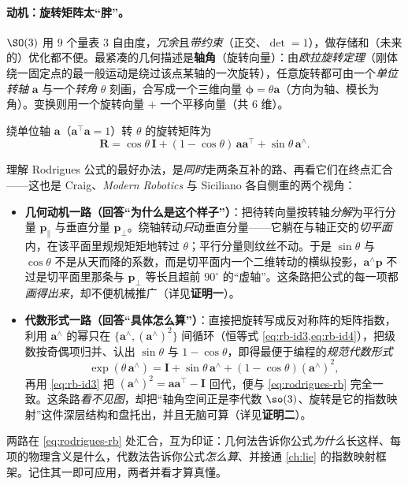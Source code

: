 \paragraph{动机：旋转矩阵太“胖”。}$\SO(3)$ 用 $9$ 个量表 $3$ 自由度，\emph{冗余}且\emph{带约束}（正交、$\det=1$），做存储和（未来的）优化都不便\cite{gaoxiang2019slam14}。最紧凑的几何描述是\textbf{轴角}（旋转向量）：由\emph{欧拉旋转定理}（刚体绕一固定点的最一般运动是绕过该点某轴的一次旋转\cite{barfoot2024state}），任意旋转都可由一个\emph{单位转轴} $\mathbf{a}$ 与一个\emph{转角} $\theta$ 刻画，合写成一个三维向量 $\boldsymbol{\phi}=\theta\mathbf{a}$（方向为轴、模长为角）。变换则用一个旋转向量 $+$ 一个平移向量（共 $6$ 维）。

\begin{theorem}\label{thm:rodrigues-rb}
绕单位轴 $\mathbf{a}$（$\mathbf{a}^\top\mathbf{a}=1$）转 $\theta$ 的旋转矩阵为
\begin{equation}
  \mathbf{R}=\cos\theta\,\mathbf{I}+(1-\cos\theta)\,\mathbf{a}\mathbf{a}^\top+\sin\theta\,\mathbf{a}^\wedge.
  \label{eq:rodrigues-rb}
\end{equation}
\end{theorem}
\begin{insight}
理解 Rodrigues 公式的最好办法，是\emph{同时}走两条互补的路、再看它们在终点汇合——这也是 Craig\cite{craig2005introduction}、\emph{Modern Robotics}\cite{lynch2017modern} 与 Siciliano\cite{siciliano2009robotics} 各自侧重的两个视角：
\begin{itemize}
  \item \textbf{几何动机一路（回答“为什么是这个样子”）}：把待转向量按转轴\emph{分解}为平行分量 $\mathbf{p}_\parallel$ 与垂直分量 $\mathbf{p}_\perp$。绕轴转动\emph{只}动垂直分量——它躺在与轴正交的\emph{切平面}内，在该平面里规规矩矩地转过 $\theta$；平行分量则纹丝不动。于是 $\sin\theta$ 与 $\cos\theta$ 不是从天而降的系数，而是切平面内一个二维转动的横纵投影，$\mathbf{a}^\wedge\mathbf{p}$ 不过是切平面里那条与 $\mathbf{p}_\perp$ 等长且超前 $90^\circ$ 的“虚轴”。这条路把公式的每一项都\emph{画得出来}，却不便机械推广（详见\textbf{证明一}）。
  \item \textbf{代数形式一路（回答“具体怎么算”）}：直接把旋转写成反对称阵的矩阵指数，利用 $\mathbf{a}^\wedge$ 的幂只在 $\{\mathbf{a}^\wedge,(\mathbf{a}^\wedge)^2\}$ 间循环（恒等式 \cref{eq:rb-id3,eq:rb-id4}），把级数按奇偶项归并、认出 $\sin\theta$ 与 $1-\cos\theta$，即得最便于编程的\emph{规范代数形式}
  \[
    \exp(\theta\,\mathbf{a}^\wedge)=\mathbf{I}+\sin\theta\,\mathbf{a}^\wedge+(1-\cos\theta)(\mathbf{a}^\wedge)^2,
  \]
  再用 \cref{eq:rb-id3} 把 $(\mathbf{a}^\wedge)^2=\mathbf{a}\mathbf{a}^\top-\mathbf{I}$ 回代，便与 \cref{eq:rodrigues-rb} 完全一致。这条路\emph{看不见图}，却把“轴角空间正是李代数 $\so(3)$、旋转是它的指数映射”这件深层结构和盘托出，并且无脑可算（详见\textbf{证明二}）。
\end{itemize}
\noindent 两路在 \cref{eq:rodrigues-rb} 处汇合，互为印证：几何法告诉你公式\emph{为什么}长这样、每项的物理含义是什么，代数法告诉你公式\emph{怎么算}、并接通 \cref{ch:lie} 的指数映射框架。记住其一即可应用，两者并看才算真懂。
\end{insight}

